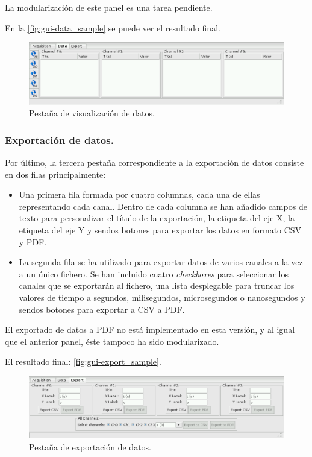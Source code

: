 	La modularización de este panel es una tarea pendiente.
	
	En la \autoref{fig:gui-data_sample} se puede ver el resultado final.
	
\begin{figure}[hb]
  \centering
  \includegraphics[width=1\textwidth]{img/gui-data_sample.png}
  \caption{Pestaña de visualización de datos.}
  \label{fig:gui-data_sample}
\end{figure}	
	\pagebreak
	\subsubsection{Exportación de datos.}\label{sec:gui_ExportGUI}
	Por último, la tercera pestaña correspondiente a la exportación de datos consiste en dos filas principalmente:
\begin{itemize}
	\item Una primera fila formada por cuatro columnas, cada una de ellas representando cada canal. Dentro de cada columna se han añadido campos de texto para personalizar el título de la exportación, la etiqueta del eje X, la etiqueta del eje Y y sendos botones para exportar los datos en formato CSV y PDF.
	\item La segunda fila se ha utilizado para exportar datos de varios canales a la vez a un único fichero. Se han incluido cuatro \emph{checkboxes} para seleccionar los canales que se exportarán al fichero, una lista desplegable para truncar los valores de tiempo a segundos, milisegundos, microsegundos o nanosegundos y sendos botones para exportar a CSV a PDF.
\end{itemize}
	
	El exportado de datos a PDF no está implementado en esta versión, y al igual que el anterior panel, éste tampoco ha sido modularizado.
	
	El resultado final: \autoref{fig:gui-export_sample}.
	
\begin{figure}[hb]
  \centering
  \includegraphics[width=1\textwidth]{img/gui-export_sample.png}
  \caption{Pestaña de exportación de datos.}
  \label{fig:gui-export_sample}
\end{figure}	
\pagebreak
